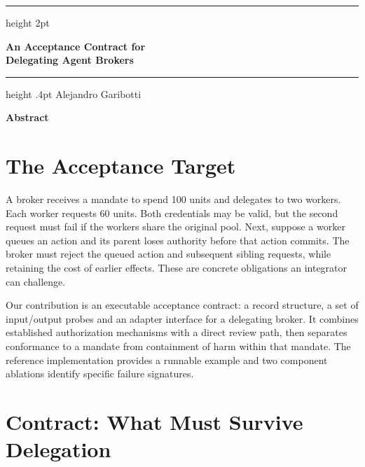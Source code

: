 \documentclass[11pt,letterpaper]{article}
\begin{document}
\begin{center}
\hrule height 2pt\vspace{9pt}
{\fontsize{20}{23}\selectfont\bfseries An Acceptance Contract for\\Delegating Agent Brokers\par}
\vspace{8pt}\hrule height .4pt\vspace{8pt}
{\large Alejandro Garibotti}\par
\vspace{3pt}{\small Apart Research AI Incident Response Sprint\quad September 2026}
\end{center}
\begin{center}\textbf{Abstract}\end{center}


\section{The Acceptance Target}
A broker receives a mandate to spend 100 units and delegates to two workers. Each
worker requests 60 units. Both credentials may be valid, but the second request
must fail if the workers share the original pool. Next, suppose a worker queues an
action and its parent loses authority before that action commits. The broker must
reject the queued action and subsequent sibling requests, while retaining the cost
of earlier effects. These are concrete obligations an integrator can challenge.

Our contribution is an executable acceptance contract: a record structure, a set
of input/output probes and an adapter interface for a delegating broker. It combines
established authorization mechanisms with a direct review path, then separates
conformance to a mandate from containment of harm within that mandate. The
reference implementation provides a runnable example and two component ablations
identify specific failure signatures.

\clearpage
\section{Contract: What Must Survive Delegation}
\end{document}
